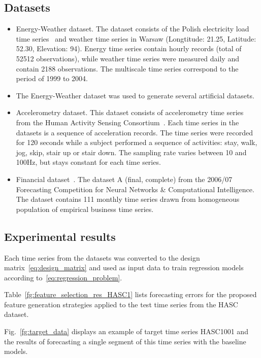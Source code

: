 \documentclass[conference]{IEEEtran}
\begin{document}
\subsection{Datasets}
\begin{itemize}
\item Energy-Weather dataset. The dataset consists of the Polish electricity load time series~\cite{EnergyWeatherData} and weather time series in Warsaw (Longtitude: 21.25, Latitude: 52.30, Elevation: 94). Energy time series contain hourly records (total of 52512 observations), while weather time series were measured daily and contain 2188 observations. The multiscale time series correspond to the period of 1999 to 2004.

\item  The Energy-Weather dataset was used to generate several artificial datasets.

\item Accelerometry dataset. This dataset consists of accelerometry time series from the Human Activity Sensing Consortium~\cite{HASCdata}. Each time series in the datasets is a sequence of acceleration records. The time series were recorded for 120 seconds while a subject performed a sequence of activities: stay, walk, jog, skip, stair up or stair down. The sampling rate varies between 10 and 100Hz, but stays constant for each time series.
\item Financial dataset~\cite{NNcompetition}.  The dataset A (final, complete) from the 2006/07 Forecasting Competition for Neural Networks \& Computational Intelligence. The dataset contains 111 monthly time series drawn from homogeneous population of empirical business time series.
\end{itemize}

\subsection{Experimental results}
Each time series from the datasets was converted to the design matrix~\eqref{eq:design_matrix} and used as input data to train regression models according to~\eqref{eq:regression_problem}.

Table~\ref{fg:feature_selection_res_HASC1} lists forecasting errors for the proposed feature generation strategies applied to the test time series from the HASC dataset.

Fig.~\ref{fg:target_data} displays an example of target time series HASC1001 and the results of forecasting a single segment of this time series with the baseline models.
\end{document}
